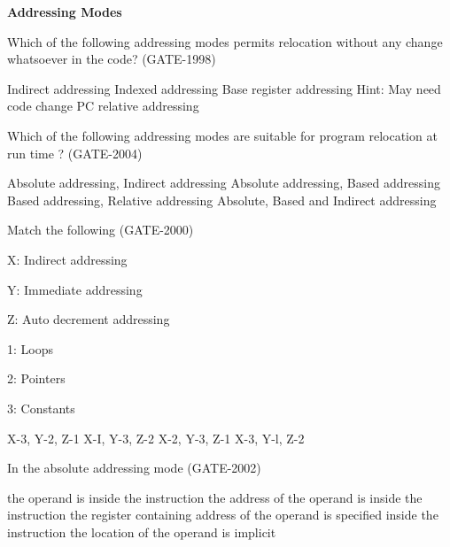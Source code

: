 
\centerline{\textbf{ \LARGE Addressing Modes}}


\begin{questyle}
  \question  Which of the following addressing modes permits relocation without any
             change whatsoever in the code?  (GATE-1998)

  \begin{choices}
    \choice         Indirect addressing
    \choice         Indexed addressing
    \choice         Base register addressing \qquad Hint: May need code change
    \CorrectChoice  PC relative addressing
  \end{choices}
\end{questyle}

\begin{questyle}
  \question  Which of the following addressing modes are suitable for program relocation at run time ?  (GATE-2004)

  \begin{choices}
    \choice         Absolute addressing, Indirect addressing
    \choice         Absolute addressing, Based addressing
    \CorrectChoice  Based addressing, Relative addressing
    \choice         Absolute, Based and Indirect addressing
  \end{choices}
\end{questyle}

\begin{questyle}
  \question  Match the following  (GATE-2000)

  \begin{multiColList}[2]
    \item[X:] Indirect addressing
    \item[Y:] Immediate addressing
    \item[Z:] Auto decrement addressing
    \item[1:] Loops
    \item[2:] Pointers
    \item[3:] Constants
  \end{multiColList}

  \begin{oneparchoices}
    \choice         X-3, Y-2, Z-1
    \choice         X-I, Y-3, Z-2
    \CorrectChoice  X-2, Y-3, Z-1
    \choice         X-3, Y-l, Z-2
  \end{oneparchoices}
\end{questyle}


\begin{questyle}
  \question  In the absolute addressing mode  (GATE-2002)

  \begin{choices}
    \choice         the operand is inside the instruction
    \CorrectChoice  the address of the operand is inside the instruction
    \choice         the register containing address of the operand is specified inside the instruction
    \choice         the location of the operand is implicit
  \end{choices}
\end{questyle}

